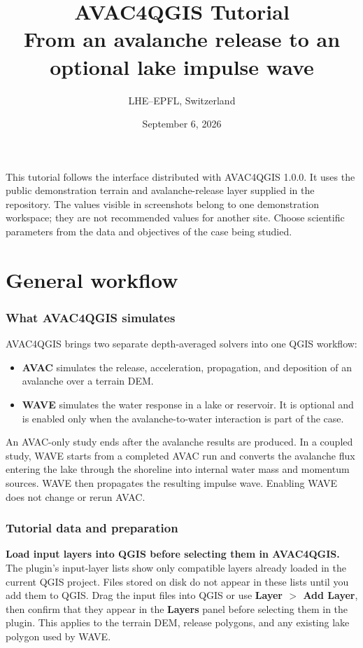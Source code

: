 \documentclass[11pt,a4paper]{article}
\title{\textbf{AVAC4QGIS Tutorial}\\[6pt]
       \large From an avalanche release to an optional lake impulse wave}
\author{LHE--EPFL, Switzerland}
\date{September 6, 2026}
\newcommand{\control}[1]{\textbf{#1}}
\newenvironment{notebox}{%
  \begin{tcolorbox}[colback=avaclight,colframe=avacblue,boxrule=.6pt,
                     arc=2pt,left=6pt,right=6pt,top=5pt,bottom=5pt]
  \small
}{%
  \end{tcolorbox}
}
\newenvironment{importantbox}{%
  \begin{tcolorbox}[colback=warnfill,colframe=warmred,boxrule=.6pt,
                     arc=2pt,left=6pt,right=6pt,top=5pt,bottom=5pt]
  \small
}{%
  \end{tcolorbox}
}
\begin{document}
\maketitle
\thispagestyle{empty}

\begin{notebox}
This tutorial follows the interface distributed with AVAC4QGIS 1.0.0. It
uses the public demonstration terrain and avalanche-release layer supplied in
the repository. The values visible in screenshots belong to one demonstration
workspace; they are not recommended values for another site. Choose scientific
parameters from the data and objectives of the case being studied.
\end{notebox}

\clearpage
\tableofcontents
\clearpage

\part{General workflow}

\section{What AVAC4QGIS simulates}

AVAC4QGIS brings two separate depth-averaged solvers into one QGIS workflow:

\begin{itemize}
  \item \control{AVAC} simulates the release, acceleration, propagation, and
        deposition of an avalanche over a terrain DEM.
  \item \control{WAVE} simulates the water response in a lake or reservoir.
        It is optional and is enabled only when the avalanche-to-water
        interaction is part of the case.
\end{itemize}

An AVAC-only study ends after the avalanche results are produced. In a coupled
study, WAVE starts from a completed AVAC run and converts the avalanche flux
entering the lake through the shoreline into internal water mass and momentum
sources. WAVE then propagates the resulting impulse wave. Enabling WAVE does
not change or rerun AVAC.

\section{Tutorial data and preparation}

\begin{importantbox}
\control{Load input layers into QGIS before selecting them in AVAC4QGIS.}
The plugin's input-layer lists show only compatible layers already loaded in
the current QGIS project. Files stored on disk do not appear in these lists
until you add them to QGIS. Drag the input files into QGIS or use
\control{Layer $>$ Add Layer}, then confirm that they appear in the
\control{Layers} panel before selecting them in the plugin. This applies to
the terrain DEM, release polygons, and any existing lake polygon used by WAVE.
\end{importantbox}
\end{document}
